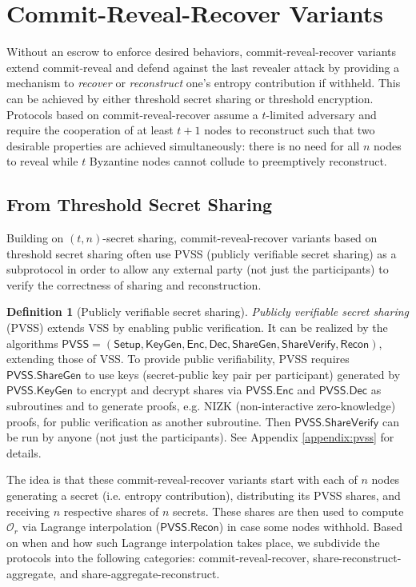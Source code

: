 \documentclass[conference]{IEEEtran}
\theoremstyle{definition}
\newtheorem{definition}[theorem]{Definition}
\theoremstyle{remark}
\begin{document}
\section{Commit-Reveal-Recover Variants}
\label{section:commit-reveal-recover}
Without an escrow to enforce desired behaviors, commit-reveal-recover variants extend commit-reveal and defend against the last revealer attack by providing a mechanism to \textit{recover} or \textit{reconstruct} one's entropy contribution if withheld. This can be achieved by either threshold secret sharing or threshold encryption. Protocols based on commit-reveal-recover assume a $t$-limited adversary and require the cooperation of at least $t + 1$ nodes to reconstruct such that two desirable properties are achieved simultaneously: there is no need for all $n$ nodes to reveal while $t$ Byzantine nodes cannot collude to preemptively reconstruct.

\subsection{From Threshold Secret Sharing}
Building on $(t, n)$-secret sharing, commit-reveal-recover variants based on threshold secret sharing often use PVSS (publicly verifiable secret sharing) \cite{schoenmakers1999simple, cascudo2017scrape} as a subprotocol in order to allow any external party (not just the participants) to verify the correctness of sharing and reconstruction.

\begin{definition}[Publicly verifiable secret sharing]
\textit{Publicly verifiable secret sharing} (PVSS) extends VSS by enabling public verification. It can be realized by the algorithms $\mathsf{PVSS} = (\mathsf{Setup}, \mathsf{KeyGen}, \mathsf{Enc}, \mathsf{Dec}, \mathsf{ShareGen}, \mathsf{ShareVerify}, \mathsf{Recon})$, extending those of VSS. To provide public verifiability, PVSS requires $\mathsf{PVSS.ShareGen}$ to use keys (secret-public key pair per participant) generated by $\mathsf{PVSS.KeyGen}$ to encrypt and decrypt shares via $\mathsf{PVSS.Enc}$ and $\mathsf{PVSS.Dec}$ as subroutines and to generate proofs, e.g. NIZK (non-interactive zero-knowledge) proofs, for public verification as another subroutine. Then $\mathsf{PVSS.ShareVerify}$ can be run by anyone (not just the participants). See Appendix \ref{appendix:pvss} for details.
\end{definition}

The idea is that these commit-reveal-recover variants start with each of $n$ nodes generating a secret (i.e. entropy contribution), distributing its PVSS shares, and receiving $n$ respective shares of $n$ secrets. These shares are then used to compute $\mathcal{O}_r$ via Lagrange interpolation ($\mathsf{PVSS.Recon}$) in case some nodes withhold. Based on when and how such Lagrange interpolation takes place, we subdivide the protocols into the following categories: commit-reveal-recover, share-reconstruct-aggregate, and share-aggregate-reconstruct.
\end{document}
